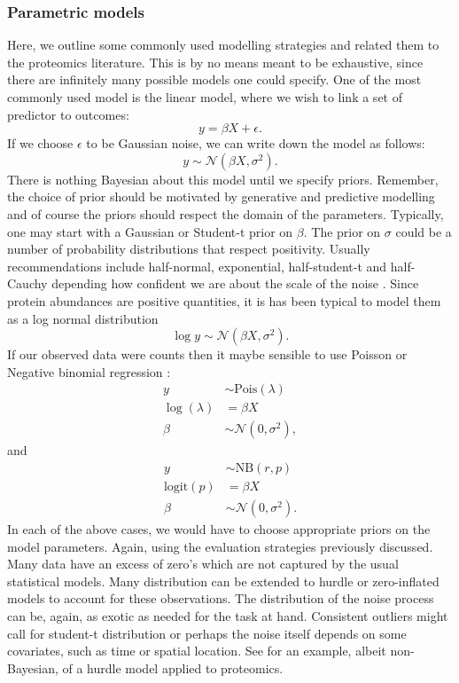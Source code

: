 \documentclass[12pt,english, journal=jpr, layout=twocolumn]{article}
\begin{document}
\subsubsection{Parametric models}
Here, we outline some commonly used modelling strategies and related them to the proteomics literature. This is by no means meant to be exhaustive, since there are infinitely many possible models one could specify. One of the most commonly used model is the linear model, where we wish to link a set of predictor to outcomes:
\begin{equation}
y = \beta X + \epsilon.
\end{equation}
If we choose $\epsilon$ to be Gaussian noise, we can write down the model as follows:
\begin{equation}
y \sim \mathcal{N}(\beta X, \sigma^2).
\end{equation}
There is nothing Bayesian about this model until we specify priors. Remember, the choice of prior should be motivated by generative and predictive modelling and of course the priors should respect the domain of the parameters. Typically, one may start with a Gaussian or Student-t prior on $\beta$. The prior on $\sigma$ could be a number of probability distributions that respect positivity. Usually recommendations include half-normal, exponential, half-student-t and half-Cauchy depending how confident we are about the scale of the noise \citep{Gelman::2017}. Since protein abundances are positive quantities, it is has been typical to model them as a log normal distribution
\begin{equation}
\log y  \sim \mathcal{N}(\beta X, \sigma^2).
\end{equation}   	
If our observed data were counts then it maybe sensible to use Poisson or Negative binomial regression \citep{Lawless::1987}:
\begin{equation}
\begin{split}
y &\sim \text{Pois}(\lambda)\\
\log(\lambda) &= \beta X\\
\beta &\sim \mathcal{N}(0, \sigma^2),
\end{split}
\end{equation}
and
\begin{equation}
	\begin{split}
		y &\sim \text{NB}(r, p)\\
		\text{logit}(p) &= \beta X\\
		\beta &\sim \mathcal{N}(0, \sigma^2).
	\end{split}
\end{equation}
In each of the above cases, we would have to choose appropriate priors on the model parameters. Again, using the evaluation strategies previously discussed. Many data have an excess of zero's which are not captured by the usual statistical models. Many distribution can be extended to hurdle or zero-inflated models to account for these observations. The distribution of the noise process can be, again, as exotic as needed for the task at hand. Consistent outliers might call for student-t distribution or perhaps the noise itself depends on some covariates, such as time or spatial location. See \citet{Goeminne::2020} for an example, albeit non-Bayesian, of a hurdle model applied to proteomics.
\end{document}
